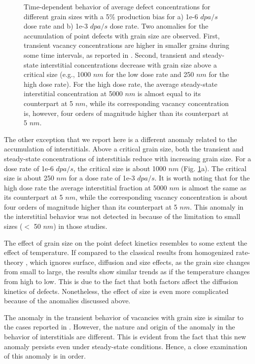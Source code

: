 \documentclass[utf8]{frontiersSCNS} %
\begin{document}
\begin{figure}[h!]
        \caption{Time-dependent behavior of average defect concentrations for different grain sizes with a 5\% production bias for a) 1e-6 $dpa/s$ dose rate and b) 1e-3 $dpa/s$ dose rate. Two anomalies for the accumulation of point defects with grain size are observed. First, transient vacancy concentrations are higher in smaller grains during some time intervals, as reported in \citep{yang2010}. Second, transient and steady-state interstitial concentrations decrease with grain size above a critical size (e.g., 1000 $nm$ for the low dose rate and 250 $nm$ for the high dose rate). For the high dose rate, the average steady-state interstitial concentration at 5000 $nm$ is almost equal to its counterpart at 5 $nm$, while its corresponding vacancy concentration is, however, four orders of magnitude higher than its counterpart at 5 $nm$.}
        \label{figure:average_concentrations_neutron_5}
    \end{figure}
    
    The other exception that we report here is a different anomaly related to the accumulation of interstitials. Above a critical grain size, both the transient and steady-state concentrations of interstitials reduce with increasing grain size. For a dose rate of 1e-6 $dpa/s$, the critical size is about 1000 $nm$ (Fig. \ref{figure:average_concentrations_neutron_5}a). The critical size is about 250 $nm$ for a dose rate of 1e-3 $dpa/s$. It is worth noting that for the high dose rate the average interstitial fraction at 5000 $nm$ is almost the same as its counterpart at 5 $nm$, while the corresponding vacancy concentration is about four orders of magnitude higher than its counterpart at 5 $nm$. This anomaly in the interstitial behavior was not detected in \citep{yang2010,demkowicz2011} because of the limitation to small sizes ($<$ 50 $nm$) in those studies.
    
    The effect of grain size on the point defect kinetics resembles to some extent the effect of temperature. If compared to the classical results from homogenized rate-theory \citep{was2017}, which ignores surface, diffusion and size effects, as the grain size changes from small to large, the results show similar trends as if the temperature changes from high to low. This is due to the fact that both factors affect the diffusion kinetics of defects. Nonetheless, the effect of size is even more complicated because of the anomalies discussed above.
    
    The anomaly in the transient behavior of vacancies with grain size is similar to the cases reported in \citep{yang2010}. However, the nature and origin of the anomaly in the behavior of interstitials are different. This is evident from the fact that this new anomaly persists even under steady-state conditions. Hence, a close examination of this anomaly is in order.
    
\end{document}

